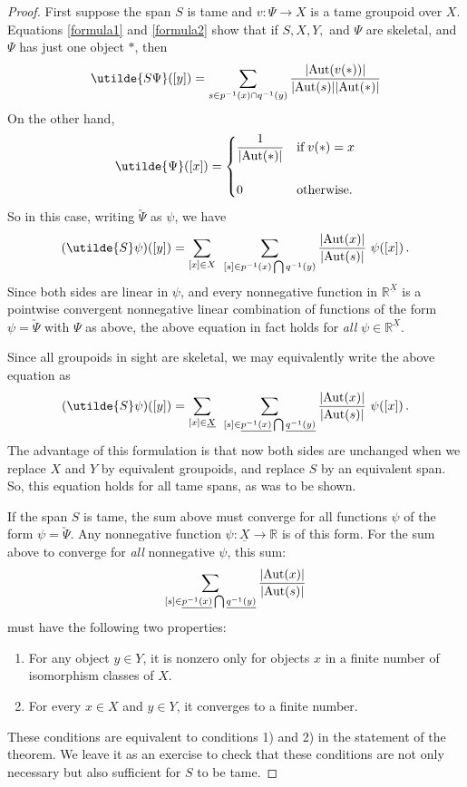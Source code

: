 \documentclass{article}
\renewcommand{\to}{\rightarrow}
\newcommand{\maps}{\colon}
\newcommand{\R}{{\mathbb R}}
\newcommand{\Aut}{{\rm Aut}}
\renewcommand{\u}[1]{\underline{#1}}
\begin{document}
\begin{proof} First suppose the span $S$ is tame and $v \maps \Psi \to X$ 
is a tame groupoid over $X$.  Equations \ref{formula1} and
\ref{formula2} show that if $S,X,Y,$ and $\Psi$ are skeletal, and
$\Psi$ has just one object $\ast$, then
\[   \utilde{S \Psi}([y]) = \sum_{s \in p^{-1}(x) \cap q^{-1}(y)}
\frac{|\Aut(v(\ast))|}{|\Aut(s)| |\Aut(\ast)|}  \]
On the other hand, 
\[   \utilde{\Psi}([x]) = 
\begin{cases}\displaystyle{\frac{1}{|\Aut(\ast)|}} 
              & \textrm{if} \; v(\ast) = x \\ 
                                           \\
              0                     & \textrm{otherwise.}  
\end{cases}
\]
So in this case, writing $\utilde{\Psi}$ as $\psi$, we have
\[   
(\utilde{S} \psi)([y]) = 
\sum_{[x] \in X} \;\,
\sum_{[s]\in p^{-1}(x) \bigcap q^{-1}(y)}
\frac{|\Aut(x)|}{|\Aut(s)|} \,\, \psi([x]) \,. 
\]
Since both sides are linear in $\psi$, and every nonnegative function
in $\R^{\u{X}}$ is a pointwise convergent nonnegative linear
combination of functions of the form $\psi = \utilde{\Psi}$ with
$\Psi$ as above, the above equation in fact holds for {\it all} $\psi
\in \R^{\u{X}}$.

Since all groupoids in sight are skeletal, we may equivalently 
write the above equation as
\[   
(\utilde{S} \psi)([y]) = 
\sum_{[x] \in \u{X}} \;\,
\sum_{[s]\in\u{p^{-1}(x)}\bigcap \u{q^{-1}(y)}}
\frac{|\Aut(x)|}{|\Aut(s)|} \,\, \psi([x]) \,. 
\]
The advantage of this formulation is that now both sides are 
unchanged when we replace $X$ and $Y$ by equivalent groupoids,
and replace $S$ by an equivalent span.   So, this equation holds
for all tame spans, as was to be shown.

If the span $S$ is tame, the sum above must converge for all 
functions $\psi$ of the form $\psi = \utilde{\Psi}$.  Any 
nonnegative function $\psi \maps \u{X} \to \R$ is of this form.
For the sum above to converge for {\it all} nonnegative $\psi$, 
this sum:
\[  \sum_{[s]\in\u{p^{-1}(x)}\bigcap \u{q^{-1}(y)}}
\frac{|\Aut(x)|} {|\Aut(s)|}\]
must have the following two properties:
\begin{enumerate}
\item
For any object $y \in Y$, it is nonzero only for objects $x$ in 
a finite number of isomorphism classes of $X$.
\item For every $x \in X$ and $y \in Y$, it converges to a finite
number.
\end{enumerate}
These conditions are equivalent to conditions 1) and 2) in the 
statement of the theorem.  We leave it as an exercise to check that
these conditions are not only necessary but also sufficient for 
$S$ to be tame.
\end{proof}
\end{document}
